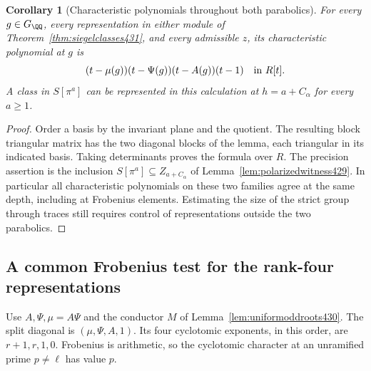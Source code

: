 \documentclass[a4paper,11pt]{article}
\newtheorem{corollary}[proposition]{Corollary}
\theoremstyle{definition}
\theoremstyle{remark}
\numberwithin{equation}{section}
\begin{document}
\begin{corollary}[Characteristic polynomials throughout both parabolics]\leavevmode
\label{cor:siegeltrace431}
For every \(g\in G_\QQ\), every representation in either
module of Theorem~\ref{thm:siegelclasses431}, and every
admissible \(z\), its characteristic polynomial at \(g\) is
\[
    (t-\mu(g))(t-\Psi(g))(t-A(g))(t-1)\quad\hbox{in }R[t].
\]
A class in \(S[\pi^a]\) can be represented in this calculation
at \(h=a+C_\alpha\) for every \(a\ge1\).
\end{corollary}
\begin{proof}
Order a basis by the invariant plane and the quotient. The
resulting block triangular matrix has the two diagonal blocks
of the lemma, each triangular in its indicated basis.
Taking determinants proves the formula over \(R\). The
precision assertion is the inclusion
\(S[\pi^a]\subseteq Z_{a+C_\alpha}\) of
Lemma~\ref{lem:polarizedwitness429}. In particular all
characteristic polynomials on these two families agree at the
same depth, including at Frobenius elements. Estimating the
size of the strict group through traces still requires control
of representations outside the two parabolics.
\end{proof}


\subsection{A common Frobenius test for the rank-four representations}
\label{sec:symplecticfrobenius433}

Use \(A,\Psi,\mu=A\Psi\) and the conductor \(M\) of
Lemma~\ref{lem:uniformoddroots430}. The split diagonal is
\((\mu,\Psi,A,1)\). Its four cyclotomic exponents, in this
order, are \(r+1,r,1,0\). Frobenius is arithmetic, so the
cyclotomic character at an unramified prime \(p\ne\ell\)
has value \(p\).
\end{document}
